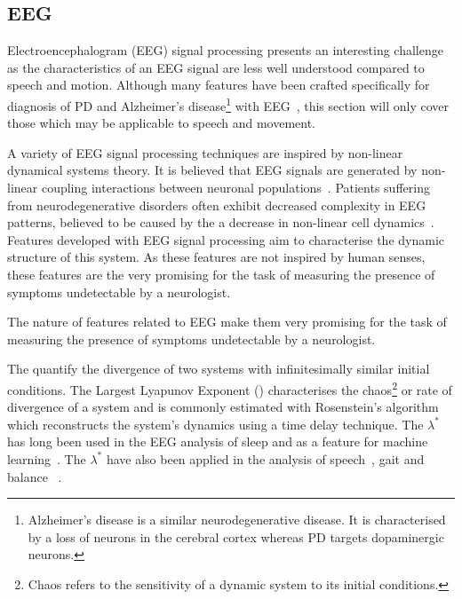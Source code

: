 \documentclass[12pt, twoside]{book}
\renewcommand\emph[1]{\textit{\color{USred}{#1}}}
\begin{document}
\subsection{EEG}
\label{eegsigproc}
Electroencephalogram (EEG) signal processing presents an interesting challenge as the characteristics of an EEG signal are less well understood compared to speech and motion. Although many features have been crafted specifically for diagnosis of PD and Alzheimer's disease\footnote{Alzheimer's disease is a similar neurodegenerative disease. It is characterised by a loss of neurons in the cerebral cortex whereas PD targets dopaminergic neurons. } with EEG~\cite{eegnonlinearpd, eegalzheimers}, this section will only cover those which may be applicable to speech and movement.

A variety of EEG signal processing techniques are inspired by non-linear dynamical systems theory. It is believed that EEG signals are generated by non-linear coupling interactions between neuronal populations~\cite{eegalzheimers}. Patients suffering from neurodegenerative disorders often exhibit decreased complexity in EEG patterns, believed to be caused by the a decrease in  non-linear cell dynamics~\cite{jelles1999decrease}. Features developed with EEG signal processing aim to characterise the dynamic structure of this system. As these features are not inspired by human senses, these features are the very promising for the task of measuring the presence of symptoms undetectable by a neurologist. 

\begin{highlight}
The nature of features related to EEG make them very promising for the task of measuring the presence of symptoms undetectable by a neurologist.
\end{highlight}


The \emph{Lyapunov Exponents} quantify the divergence of two systems with infinitesimally similar initial conditions. The Largest Lyapunov Exponent (\emph{$\lambda^*$}) characterises the chaos\footnote{Chaos refers to the sensitivity of a dynamic system to its initial conditions.} or rate of divergence of a system and is commonly estimated with Rosenstein's algorithm~\cite{rosenstein1993practicallyapunov} which reconstructs the system's dynamics using a time delay technique. The $\lambda^*$ has long been used in the EEG analysis of sleep and as a feature for machine learning~\cite{eeglyapunov1, eeglyapunov2}. The $\lambda^*$ have also been applied in the analysis of speech~\cite{banbrook1999speechlyapunov,kokkinos2005nonlinearlyapunov}, gait and balance ~\cite{dingwell2000nonlinearlyapunov, howcroft2014analysisgaitlyapunov, liu2015analysislyapunov}.
\end{document}

